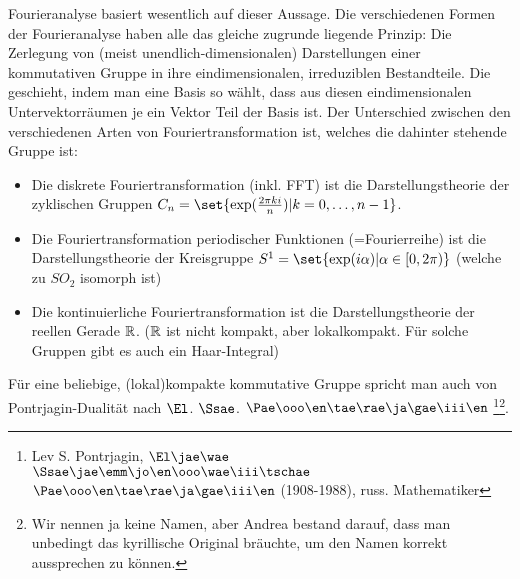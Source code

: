 \begin{remark}
Fourieranalyse basiert wesentlich auf dieser Aussage. Die verschiedenen Formen der Fourieranalyse haben alle das gleiche zugrunde liegende Prinzip: Die Zerlegung von (meist unendlich-dimensionalen) Darstellungen einer kommutativen Gruppe in ihre eindimensionalen, irreduziblen Bestandteile. Die geschieht, indem man eine Basis so wählt, dass aus diesen eindimensionalen Untervektorräumen je ein Vektor Teil der Basis ist. Der Unterschied zwischen den verschiedenen Arten von Fouriertransformation ist, welches die dahinter stehende Gruppe ist:

\begin{itemize}
\item Die diskrete Fouriertransformation (inkl. FFT) ist die Darstellungstheorie der zyklischen Gruppen $C_n = \set{\exp(\frac{2\pi k i}{n}) | k=0,\ldots,n-1}$.
\item Die Fouriertransformation periodischer Funktionen (=Fourierreihe) ist die Darstellungstheorie der Kreisgruppe $S^1 = \set{\exp(i\alpha) | \alpha\in[0,2\pi)}$ (welche zu $SO_2$ isomorph ist)
\item Die kontinuierliche Fouriertransformation ist die Darstellungstheorie der reellen Gerade $\mathbb{R}$. ($\mathbb{R}$ ist nicht kompakt, aber lokalkompakt. Für solche Gruppen gibt es auch ein Haar-Integral)
\end{itemize}

Für eine beliebige, (lokal)kompakte kommutative Gruppe spricht man auch von Pontrjagin-Dualität nach $\El$. $\Ssae$. $\Pae\ooo\en\tae\rae\ja\gae\iii\en$
\footnote{Lev S. Pontrjagin, $\El\jae\wae$ $\Ssae\jae\emm\jo\en\ooo\wae\iii\tschae$ $\Pae\ooo\en\tae\rae\ja\gae\iii\en$ (1908-1988), russ. Mathematiker}\footnote{Wir nennen ja keine Namen, aber Andrea bestand darauf, dass man unbedingt das kyrillische Original bräuchte, um den Namen korrekt aussprechen zu können.}.
\end{remark}

